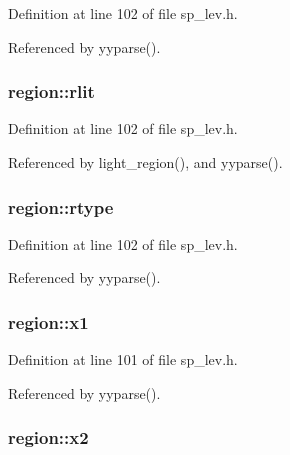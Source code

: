Definition at line 102 of file sp\+\_\+lev.\+h.



Referenced by yyparse().

\hypertarget{structregion_aa560a01138b08e4502606ee04264b61a}{
\subsubsection[{rlit}]{ region\+::rlit}}\label{structregion_aa560a01138b08e4502606ee04264b61a}


Definition at line 102 of file sp\+\_\+lev.\+h.



Referenced by light\+\_\+region(), and yyparse().

\hypertarget{structregion_adf282130a82315ad09863c2297250ca0}{
\subsubsection[{rtype}]{ region\+::rtype}}\label{structregion_adf282130a82315ad09863c2297250ca0}


Definition at line 102 of file sp\+\_\+lev.\+h.



Referenced by yyparse().

\hypertarget{structregion_a80b426260fecceafe00d352ecf1b6705}{
\subsubsection[{x1}]{ region\+::x1}}\label{structregion_a80b426260fecceafe00d352ecf1b6705}


Definition at line 101 of file sp\+\_\+lev.\+h.



Referenced by yyparse().

\hypertarget{structregion_af0027dbdcdf1abf65a30619bd48c2862}{
\subsubsection[{x2}]{ region\+::x2}}\label{structregion_af0027dbdcdf1abf65a30619bd48c2862}


